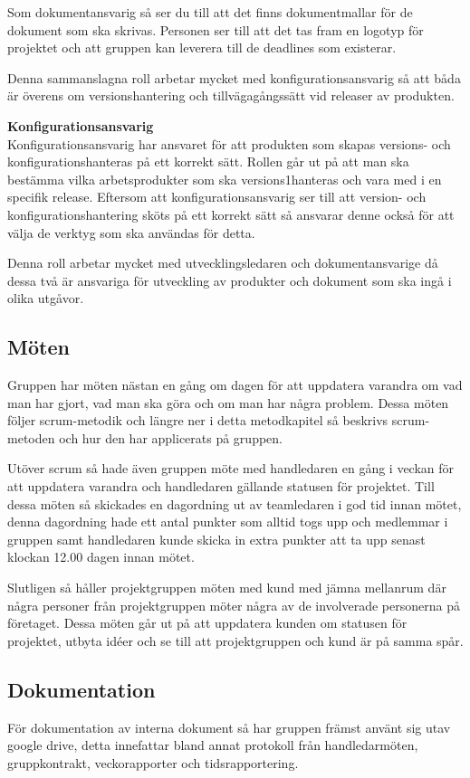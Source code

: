 Som dokumentansvarig så ser du till att det finns dokumentmallar för de dokument som ska skrivas. Personen ser till att det tas fram en logotyp för projektet och att gruppen kan leverera till de deadlines som existerar.

Denna sammanslagna roll arbetar mycket med konfigurationsansvarig så att båda är överens om versionshantering och tillvägagångssätt vid releaser av produkten.

\textbf{Konfigurationsansvarig}
\\Konfigurationsansvarig har ansvaret för att produkten som skapas versions- och konfigurationshanteras på ett korrekt sätt. Rollen går ut på att man ska bestämma vilka arbetsprodukter som ska versions1hanteras och vara med i en specifik release. Eftersom att konfigurationsansvarig ser till att version- och konfigurationshantering sköts på ett korrekt sätt så ansvarar denne också för att välja de verktyg som ska användas för detta.

Denna roll arbetar mycket med utvecklingsledaren och dokumentansvarige då dessa två är ansvariga för utveckling av produkter och dokument som ska ingå i olika utgåvor.

\subsection{Möten}
Gruppen har möten nästan en gång om dagen för att uppdatera varandra om vad man har gjort, vad man ska göra och om man har några problem. Dessa möten följer scrum-metodik och längre ner i detta metodkapitel så beskrivs scrum-metoden och hur den har applicerats på gruppen.

Utöver scrum så hade även gruppen möte med handledaren en gång i veckan för att uppdatera varandra och handledaren gällande statusen för projektet. Till dessa möten så skickades en dagordning ut av teamledaren i god tid innan mötet, denna dagordning hade ett antal punkter som alltid togs upp och medlemmar i gruppen samt handledaren kunde skicka in extra punkter att ta upp senast klockan 12.00 dagen innan mötet.

Slutligen så håller projektgruppen möten med kund med jämna mellanrum där några personer från projektgruppen möter några av de involverade personerna på företaget. Dessa möten går ut på att uppdatera kunden om statusen för projektet, utbyta idéer och se till att projektgruppen och kund är på samma spår.

\subsection{Dokumentation}
För dokumentation av interna dokument så har gruppen främst använt sig utav google drive, detta innefattar bland annat protokoll från handledarmöten, gruppkontrakt, veckorapporter och tidsrapportering.

